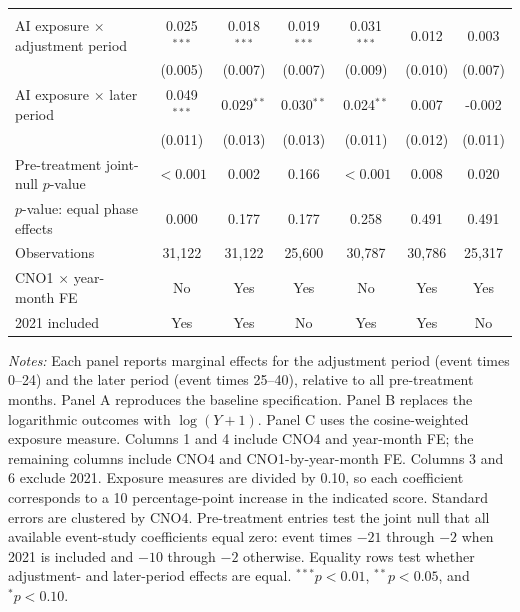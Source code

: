 \begin{table}[H]
\begin{threeparttable}
{\begin{tabular}{lcccccc}
\addlinespace[5pt]
\multicolumn{7}{l}{\textbf{Panel C. Alternative exposure: cosine-weighted}} \\
AI exposure $\times$ adjustment period & 0.025$^{***}$ & 0.018$^{***}$ & 0.019$^{***}$ & 0.031$^{***}$ & 0.012 & 0.003 \\
 & (0.005) & (0.007) & (0.007) & (0.009) & (0.010) & (0.007) \\
AI exposure $\times$ later period & 0.049$^{***}$ & 0.029$^{**}$ & 0.030$^{**}$ & 0.024$^{**}$ & 0.007 & -0.002 \\
 & (0.011) & (0.013) & (0.013) & (0.011) & (0.012) & (0.011) \\
\addlinespace[2pt]
Pre-treatment joint-null $p$-value & $<0.001$ & 0.002 & 0.166 & $<0.001$ & 0.008 & 0.020 \\
$p$-value: equal phase effects & 0.000 & 0.177 & 0.177 & 0.258 & 0.491 & 0.491 \\
Observations & 31,122 & 31,122 & 25,600 & 30,787 & 30,786 & 25,317 \\
\midrule
CNO1 $\times$ year-month FE & No & Yes & Yes & No & Yes & Yes \\
2021 included & Yes & Yes & No & Yes & Yes & No \\
\bottomrule
\end{tabular}
}
\begin{minipage}{\textwidth}
\footnotesize
\emph{Notes:} Each panel reports marginal effects for the adjustment period (event times 0--24) and the later period (event times 25--40), relative to all pre-treatment months. Panel A reproduces the baseline specification. Panel B replaces the logarithmic outcomes with $\log(Y+1)$. Panel C uses the cosine-weighted exposure measure. Columns 1 and 4 include CNO4 and year-month FE; the remaining columns include CNO4 and CNO1-by-year-month FE. Columns 3 and 6 exclude 2021. Exposure measures are divided by 0.10, so each coefficient corresponds to a 10 percentage-point increase in the indicated score. Standard errors are clustered by CNO4. Pre-treatment entries test the joint null that all available event-study coefficients equal zero: event times $-21$ through $-2$ when 2021 is included and $-10$ through $-2$ otherwise. Equality rows test whether adjustment- and later-period effects are equal. $^{***}p<0.01$, $^{**}p<0.05$, and $^{*}p<0.10$.
\end{minipage}
\end{threeparttable}
\end{table}
